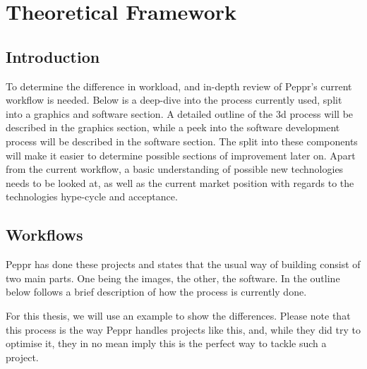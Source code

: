%
\chapter{Theoretical Framework}

\section{Introduction}
To determine the difference in workload, and in-depth review of Peppr's current workflow is needed. Below is a deep-dive into the process currently used, split into a graphics and software section. A detailed outline of the 3d process will be described in the graphics section, while a peek into the software development process will be described in the software section. The split into these components will make it easier to determine possible sections of improvement later on.
Apart from the current workflow, a basic understanding of possible new technologies needs to be looked at, as well as the current market position with regards to the technologies hype-cycle and acceptance.

\clearpage
\section{Workflows}
Peppr has done these projects and states that the usual way of building consist of two main parts. One being the images, the other, the software. In the outline below follows a brief description of how the process is currently done. 

For this thesis, we will use an example to show the differences. Please note that this process is the way Peppr handles projects like this, and, while they did try to optimise it, they in no mean imply this is the perfect way to tackle such a project. 



